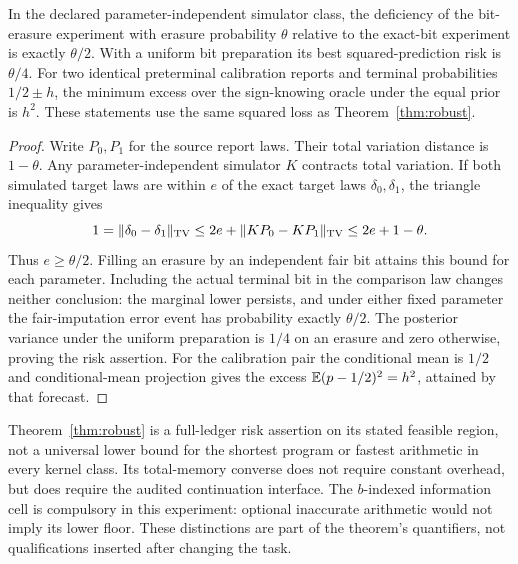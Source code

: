 \begin{proposition}\label{prop:floors}
In the declared parameter-independent simulator class, the deficiency of the bit-erasure experiment with erasure probability $\theta$ relative to the exact-bit experiment is exactly $\theta/2$. With a uniform bit preparation its best squared-prediction risk is $\theta/4$. For two identical preterminal calibration reports and terminal probabilities $1/2\pm h$, the minimum excess over the sign-knowing oracle under the equal prior is $h^2$. These statements use the same squared loss as Theorem~\ref{thm:robust}.
\end{proposition}
\begin{proof}
Write $P_0,P_1$ for the source report laws. Their total variation distance is $1-\theta$. Any parameter-independent simulator $K$ contracts total variation. If both simulated target laws are within $e$ of the exact target laws $\delta_0,\delta_1$, the triangle inequality gives
\[
 1=\|\delta_0-\delta_1\|_{\mathrm{TV}}
     \le2e+\|KP_0-KP_1\|_{\mathrm{TV}}\le2e+1-\theta.
\]
Thus $e\ge\theta/2$. Filling an erasure by an independent fair bit attains this bound for each parameter. Including the actual terminal bit in the comparison law changes neither conclusion: the marginal lower persists, and under either fixed parameter the fair-imputation error event has probability exactly $\theta/2$. The posterior variance under the uniform preparation is $1/4$ on an erasure and zero otherwise, proving the risk assertion. For the calibration pair the conditional mean is $1/2$ and conditional-mean projection gives the excess $\mathbb E(p-1/2)^2=h^2$, attained by that forecast.
\end{proof}

Theorem~\ref{thm:robust} is a full-ledger risk assertion on its stated feasible region, not a universal lower bound for the shortest program or fastest arithmetic in every kernel class. Its total-memory converse does not require constant overhead, but does require the audited continuation interface. The $b$-indexed information cell is compulsory in this experiment: optional inaccurate arithmetic would not imply its lower floor. These distinctions are part of the theorem's quantifiers, not qualifications inserted after changing the task.
